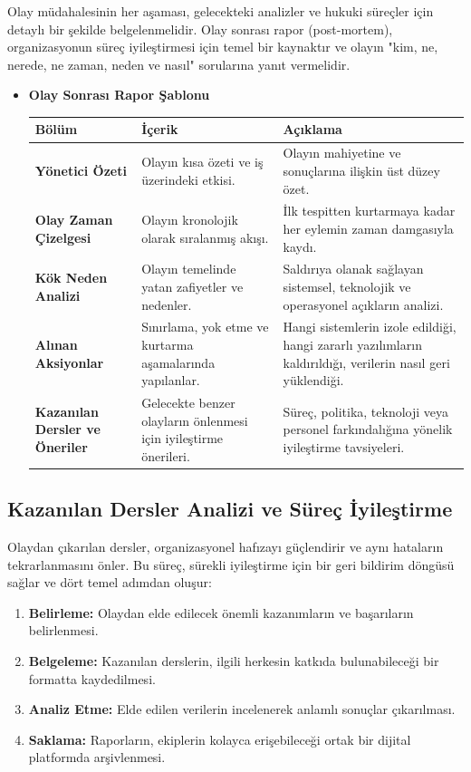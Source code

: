 \begin{itemize}
Olay müdahalesinin her aşaması, gelecekteki analizler ve hukuki süreçler için detaylı bir şekilde belgelenmelidir. Olay sonrası rapor (post-mortem), organizasyonun süreç iyileştirmesi için temel bir kaynaktır ve olayın "kim, ne, nerede, ne zaman, neden ve nasıl" sorularına yanıt vermelidir.

\begin{itemize}
    \item \textbf{Olay Sonrası Rapor Şablonu}
    \begin{tabular}{|l|l|l|}
    \hline
    \textbf{Bölüm} & \textbf{İçerik} & \textbf{Açıklama} \\
    \hline
    \textbf{Yönetici Özeti} & Olayın kısa özeti ve iş üzerindeki etkisi. & Olayın mahiyetine ve sonuçlarına ilişkin üst düzey özet. \\
    \hline
    \textbf{Olay Zaman Çizelgesi} & Olayın kronolojik olarak sıralanmış akışı. & İlk tespitten kurtarmaya kadar her eylemin zaman damgasıyla kaydı. \\
    \hline
    \textbf{Kök Neden Analizi} & Olayın temelinde yatan zafiyetler ve nedenler. & Saldırıya olanak sağlayan sistemsel, teknolojik ve operasyonel açıkların analizi. \\
    \hline
    \textbf{Alınan Aksiyonlar} & Sınırlama, yok etme ve kurtarma aşamalarında yapılanlar. & Hangi sistemlerin izole edildiği, hangi zararlı yazılımların kaldırıldığı, verilerin nasıl geri yüklendiği. \\
    \hline
    \textbf{Kazanılan Dersler ve Öneriler} & Gelecekte benzer olayların önlenmesi için iyileştirme önerileri. & Süreç, politika, teknoloji veya personel farkındalığına yönelik iyileştirme tavsiyeleri. \\
    \hline
    \end{tabular}
\end{itemize}

\subsection{Kazanılan Dersler Analizi ve Süreç İyileştirme}

Olaydan çıkarılan dersler, organizasyonel hafızayı güçlendirir ve aynı hataların tekrarlanmasını önler. Bu süreç, sürekli iyileştirme için bir geri bildirim döngüsü sağlar ve dört temel adımdan oluşur:

\begin{enumerate}
    \item \textbf{Belirleme:} Olaydan elde edilecek önemli kazanımların ve başarıların belirlenmesi.
    \item \textbf{Belgeleme:} Kazanılan derslerin, ilgili herkesin katkıda bulunabileceği bir formatta kaydedilmesi.
    \item \textbf{Analiz Etme:} Elde edilen verilerin incelenerek anlamlı sonuçlar çıkarılması.
    \item \textbf{Saklama:} Raporların, ekiplerin kolayca erişebileceği ortak bir dijital platformda arşivlenmesi.
\end{enumerate}


\end{itemize}
